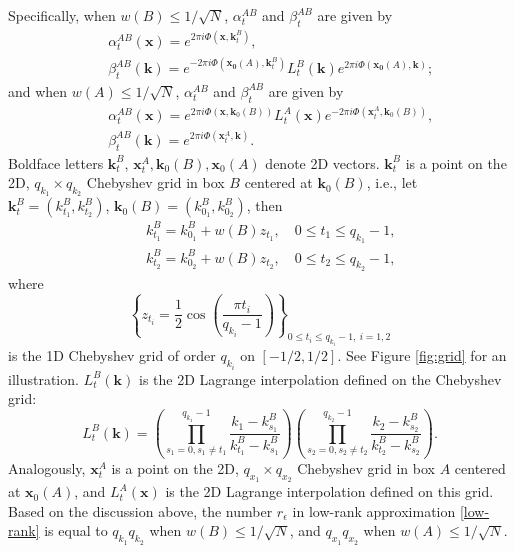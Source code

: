 Specifically, when $w(B)\leq1/\sqrt{N}$, $\alpha_t^{AB}$ and $\beta_t^{AB}$ are given by
\begin{eqnarray} 
&&\alpha_t^{AB}(\mathbf{x})=e^{2\pi i
  \Phi(\mathbf{x},\mathbf{k}_t^B)}, \label{expan1a} \\
&&\beta_t^{AB}(\mathbf{k})=e^{-2\pi i
  \Phi(\mathbf{x_0}(A),\mathbf{k}_t^B)}L_t^B(\mathbf{k}) e^{2\pi i
  \Phi(\mathbf{x_0}(A),\mathbf{k})}; \label{expan1b}
\end{eqnarray}
and when $w(A)\leq1/\sqrt{N}$, $\alpha_t^{AB}$ and $\beta_t^{AB}$ are given by
\begin{eqnarray} 
&&\alpha_t^{AB}(\mathbf{x})=e^{2\pi i
  \Phi(\mathbf{x},\mathbf{k}_0(B))}L_t^A(\mathbf{x}) e^{-2\pi i
  \Phi(\mathbf{x}_t^A,\mathbf{k}_0(B))},   \label{expan2a} \\
&&\beta_t^{AB}(\mathbf{k})=e^{2\pi i
  \Phi(\mathbf{x}_t^A,\mathbf{k})}. \label{expan2b}
\end{eqnarray}
Boldface letters $\mathbf{k}_t^B$, $\mathbf{x}_t^A, \mathbf{k}_0(B), \mathbf{x}_0(A)$ denote 2D vectors. $\mathbf{k}_t^B$ is a point on the 2D, $q_{k_1}\times q_{k_2}$ Chebyshev grid in box $B$ centered at $\mathbf{k}_0(B)$, i.e., let $\mathbf{k}_t^B=(k_{t_1}^B,k_{t_2}^B)$, $\mathbf{k}_0(B)=(k_{0_1}^B,k_{0_2}^B)$, then
\begin{eqnarray}
&&k_{t_1}^B=k_{0_1}^B+w(B)z_{t_1}, \quad 0\leq t_1 \leq q_{k_1}-1, \\
&&k_{t_2}^B=k_{0_2}^B+w(B)z_{t_2}, \quad 0\leq t_2 \leq q_{k_2}-1,
\end{eqnarray}
where 
\begin{equation}
\left\{z_{t_i}=\frac{1}{2}\cos\left( \frac{\pi t_i}{q_{k_i}-1}\right)\right\}_{0\leq t_i\leq
  q_{k_i}-1,\  i=1,2}
\end{equation}
is the 1D Chebyshev grid of order $q_{k_i}$ on $[-1/2,1/2]$. See Figure \ref{fig:grid} for an illustration. $L_t^B(\mathbf{k})$ is the 2D Lagrange interpolation defined on the Chebyshev grid:
\begin{equation}
L_t^B(\mathbf{k})=\left(\prod_{s_1=0, s_1\neq t_1}^{ q_{k_1}-1}\frac{k_1-k_{s_1}^B}{k_{t_1}^B-k_{s_1}^B}   \right)
\left(\prod_{s_2=0, s_2\neq t_2}^{
    q_{k_2}-1}\frac{k_2-k_{s_2}^B}{k_{t_2}^B-k_{s_2}^B}
\right).
\end{equation}
Analogously, $\mathbf{x}_t^A$ is a point on the 2D, $q_{x_1}\times q_{x_2}$ Chebyshev grid in box $A$ centered at $\mathbf{x}_0(A)$, and $L_t^A(\mathbf{x})$ is the 2D Lagrange interpolation defined on this grid. Based on the discussion above, the number  $r_{\epsilon}$ in low-rank approximation \ref{low-rank} is equal to $q_{k_1}q_{k_2}$ when $w(B)\leq 1/\sqrt{N}$, and $q_{x_1}q_{x_2}$ when $w(A)\leq 1/\sqrt{N}$.


